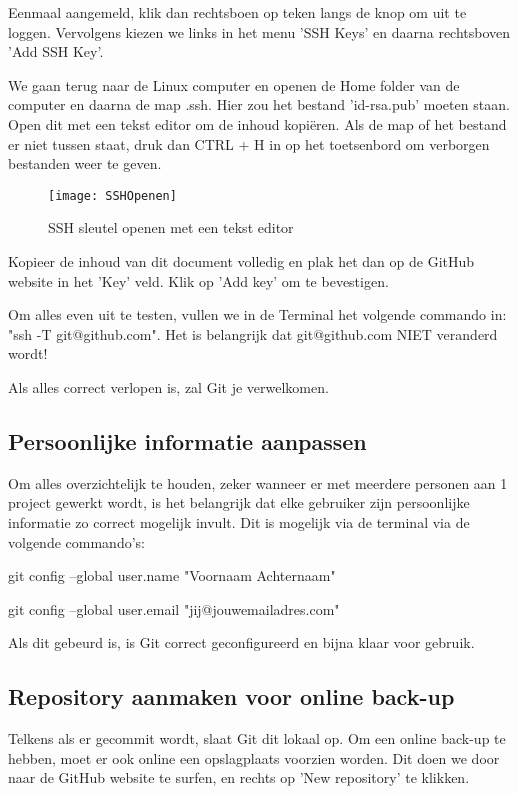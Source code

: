 \documentclass[12pt]{article}
\begin{document}
Eenmaal aangemeld, klik dan rechtsboen op teken langs de knop om uit te loggen. Vervolgens kiezen we links in het menu 'SSH Keys' en daarna rechtsboven 'Add SSH Key'.

We gaan terug naar de Linux computer en openen de Home folder van de computer en daarna de map .ssh. Hier zou het bestand 'id-rsa.pub' moeten staan. Open dit met een tekst editor om de inhoud kopi\"{e}ren. Als de map of het bestand er niet tussen staat, druk dan CTRL + H in op het toetsenbord om verborgen bestanden weer te geven.

\begin{figure} [!ht]
\begin{center}
	\texttt{[image: SSHOpenen]}
\end{center}
	\caption{SSH sleutel openen met een tekst editor}
\end{figure}

Kopieer de inhoud van dit document volledig en plak het dan op de GitHub website in het 'Key' veld. Klik op 'Add key' om te bevestigen.

Om alles even uit te testen, vullen we in de Terminal het volgende commando in: "ssh -T git@github.com". Het is belangrijk dat git@github.com NIET veranderd wordt!

Als alles correct verlopen is, zal Git je verwelkomen.

\subsection{Persoonlijke informatie aanpassen}
Om alles overzichtelijk te houden, zeker wanneer er met meerdere personen aan 1 project gewerkt wordt, is het belangrijk dat elke gebruiker zijn persoonlijke informatie zo correct mogelijk invult. Dit is mogelijk via de terminal via de volgende commando's:

git config --global user.name "Voornaam Achternaam"

git config --global user.email "jij@jouwemailadres.com"

Als dit gebeurd is, is Git correct geconfigureerd en bijna klaar voor gebruik.

\subsection{Repository aanmaken voor online back-up}
Telkens als er gecommit wordt, slaat Git dit lokaal op. Om een online back-up te hebben, moet er ook online een opslagplaats voorzien worden. Dit doen we door naar de GitHub website te surfen, en rechts op 'New repository' te klikken.
\end{document}
